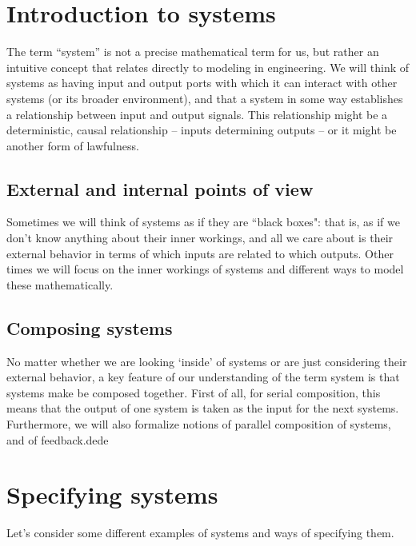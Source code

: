 
\section{Introduction to systems}


The term ``system'' is not a precise mathematical term for us, but rather an intuitive concept that relates directly to modeling in engineering.
We will think of systems as having input and output ports with which it can interact with other systems (or its broader environment), and that a system in some way establishes a relationship between input and output signals.
This relationship might be a deterministic, causal relationship -- inputs determining outputs -- or it might be another form of lawfulness.

\subsection{External and internal points of view}

Sometimes we will think of systems as if they are ``black boxes": that is, as if we don't know anything about their inner workings, and all we care about is their external behavior in terms of which inputs are related to which outputs.
Other times we will focus on the inner workings of systems and different ways to model these mathematically.

\subsection{Composing systems}

No matter whether we are looking `inside' of systems or are just considering their external behavior, a key feature of our understanding of the term system is that systems make be composed together.
First of all, for serial composition, this means that the output of one system is taken as the input for the next systems.
Furthermore, we will also formalize notions of parallel composition of systems, and of feedback.dede
\section{Specifying systems}

Let's consider some different examples of systems and ways of specifying them.

